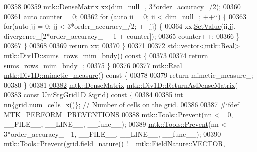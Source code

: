 \begin{DoxyCode}
{{00358 
00359   \hyperlink{classmtk_1_1DenseMatrix}{mtk::DenseMatrix} xx(dim\_null\_, 3*order\_accuracy\_/2);
00360 
00361   \textcolor{keyword}{auto} counter = 0;
00362   \textcolor{keywordflow}{for} (\textcolor{keyword}{auto} ii = 0; ii < dim\_null\_; ++ii) \{
00363     \textcolor{keywordflow}{for}(\textcolor{keyword}{auto} jj = 0; jj < 3*order\_accuracy\_/2; ++jj) \{
00364       xx.\hyperlink{classmtk_1_1DenseMatrix_a784ce5784109ac86bfb9d8562b334b13}{SetValue}(ii,jj, divergence\_[2*order\_accuracy\_ + 1 + counter]);
00365       counter++;
00366     \}
00367   \}
00368 
00369   \textcolor{keywordflow}{return} xx;
00370 \}
00371 
\hypertarget{mtk__div__1d_8cc_source_l00372}{}\hyperlink{classmtk_1_1Div1D_a8c611354217cb15cdb41c23b067fb398}{00372} std::vector<mtk::Real> \hyperlink{classmtk_1_1Div1D_a8c611354217cb15cdb41c23b067fb398}{mtk::Div1D::sums\_rows\_mim\_bndy}()\textcolor{keyword}{ const }\{
00373 
00374   \textcolor{keywordflow}{return} sums\_rows\_mim\_bndy\_;
00375 \}
00376 
\hypertarget{mtk__div__1d_8cc_source_l00377}{}\hyperlink{classmtk_1_1Div1D_a00caf61168e7b4b14b488eab0fe08ee4}{00377} \hyperlink{group__c01-roots_gac080bbbf5cbb5502c9f00405f894857d}{mtk::Real} \hyperlink{classmtk_1_1Div1D_a00caf61168e7b4b14b488eab0fe08ee4}{mtk::Div1D::mimetic\_measure}()\textcolor{keyword}{ const }\{
00378 
00379   \textcolor{keywordflow}{return} mimetic\_measure\_;
00380 \}
00381 
\hypertarget{mtk__div__1d_8cc_source_l00382}{}\hyperlink{classmtk_1_1Div1D_a213fddbaaf86e4840c6a9649b69c2d49}{00382} \hyperlink{classmtk_1_1DenseMatrix}{mtk::DenseMatrix} \hyperlink{classmtk_1_1Div1D_a213fddbaaf86e4840c6a9649b69c2d49}{mtk::Div1D::ReturnAsDenseMatrix}(
00383   \textcolor{keyword}{const} \hyperlink{classmtk_1_1UniStgGrid1D}{UniStgGrid1D} &grid)\textcolor{keyword}{ const }\{
00384 
00385   \textcolor{keywordtype}{int} nn\{grid.\hyperlink{classmtk_1_1UniStgGrid1D_af1b3729d8afa07be5b2775ed68015b80}{num\_cells\_x}()\}; \textcolor{comment}{// Number of cells on the grid.}
00386 
00387 \textcolor{preprocessor}{  #ifdef MTK\_PERFORM\_PREVENTIONS}
00388   \hyperlink{classmtk_1_1Tools_a332324c6f25e66be9dff48c5987a3b9f}{mtk::Tools::Prevent}(nn <= 0, \_\_FILE\_\_, \_\_LINE\_\_, \_\_func\_\_);
00389   \hyperlink{classmtk_1_1Tools_a332324c6f25e66be9dff48c5987a3b9f}{mtk::Tools::Prevent}(nn < 3*order\_accuracy\_ - 1, \_\_FILE\_\_, \_\_LINE\_\_, \_\_func\_\_);
00390   \hyperlink{classmtk_1_1Tools_a332324c6f25e66be9dff48c5987a3b9f}{mtk::Tools::Prevent}(grid.\hyperlink{classmtk_1_1UniStgGrid1D_a6f6a5a23011fe90971ed6b8f5f640cd2}{field\_nature}() != 
      \hyperlink{namespacemtk_ga4c54f2a329cfb4e56213b02a259d19e2a87752381b583740610f1dfeb07fdad7e}{mtk::FieldNature::VECTOR},
}}
\end{DoxyCode}

